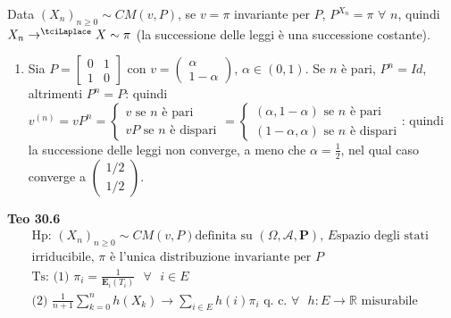 \documentclass{article}
\begin{document}
Data $\left( X_{n}\right) _{n\geq 0}\sim CM\left( v,P\right) $, se $v=\pi $
invariante per $P$, $P^{X_{n}}=\pi $ $\forall $ $n$, quindi $%
X_{n}\rightarrow ^{\tciLaplace }X\sim \pi $ (la successione delle leggi \`{e}
una successione costante).

\begin{enumerate}
\item Sia $P=\left[ 
\begin{array}{cc}
0 & 1 \\ 
1 & 0%
\end{array}%
\right] $ con $v=\left( 
\begin{array}{c}
\alpha \\ 
1-\alpha%
\end{array}%
\right) $, $\alpha \in \left( 0,1\right) $. Se $n$ \`{e} pari, $P^{n}=Id$,
altrimenti $P^{n}=P$: quindi $v^{\left( n\right) }=vP^{n}=\left\{ 
\begin{array}{c}
v\text{ se }n\text{ \`{e} pari} \\ 
vP\text{ se }n\text{ \`{e} dispari}%
\end{array}%
\right. =\left\{ 
\begin{array}{c}
\left( \alpha ,1-\alpha \right) \text{ se }n\text{ \`{e} pari} \\ 
\left( 1-\alpha ,\alpha \right) \text{ se }n\text{ \`{e} dispari}%
\end{array}%
\right. $: quindi la successione delle leggi non converge, a meno che $%
\alpha =\frac{1}{2}$, nel qual caso converge a $\left( 
\begin{array}{c}
1/2 \\ 
1/2%
\end{array}%
\right) $.
\end{enumerate}

\textbf{Teo 30.6}%
\begin{gather*}
\text{Hp: }\left( X_{n}\right) _{n\geq 0}\sim CM\left( v,P\right) \text{
definita su }\left( \Omega ,\mathcal{A},\mathbf{P}\right) \text{, }E\text{
spazio degli stati } \\
\text{irriducibile, }\pi \text{ \`{e} l'unica distribuzione invariante per }P
\\
\text{Ts: (1) }\pi _{i}=\frac{1}{\mathbf{E}_{i}\left( T_{i}\right) }\text{ }%
\forall \text{ }i\in E \\
\text{(2) }\frac{1}{n+1}\sum_{k=0}^{n}h\left( X_{k}\right) \rightarrow
\sum_{i\in E}h\left( i\right) \pi _{i}\text{ q. c. }\forall \text{ }%
h:E\rightarrow 
\mathbb{R}
\text{ misurabile}
\end{gather*}
\end{document}
